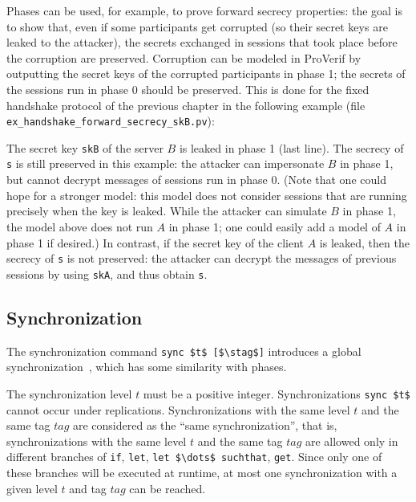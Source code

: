 \documentclass{book}
\begin{document}
Phases can be used, for example, to prove forward secrecy properties: the goal is to show that, even if some participants get corrupted (so their secret keys are leaked to the attacker), the secrets exchanged in sessions that took place before the corruption are preserved. Corruption can be modeled in ProVerif by outputting the secret keys of the corrupted participants in phase 1; the secrets of the sessions run in phase 0 should be preserved. This is done for the fixed handshake protocol of the previous chapter in the following example (file {\tt {\docexdir}ex\_handshake\_forward\_secrecy\_skB.pv}):
%

%
The secret key \lstinline!skB! of the server $B$ is leaked in phase 1 (last line).
The secrecy of \lstinline!s! is still preserved in this example: the attacker
can impersonate $B$ in phase 1, but cannot decrypt messages of sessions run in phase 0. (Note that one could hope for a stronger model: this model does not consider sessions that are running precisely when the key is leaked. While the attacker can simulate $B$ in phase 1, the model above does not run $A$ in phase 1; one could easily add a model of $A$ in phase 1 if desired.)
In contrast, if the secret key of the client $A$ is leaked, then the secrecy of \lstinline!s! is not preserved: the attacker can decrypt the messages of previous sessions by using \lstinline!skA!, and thus obtain \lstinline!s!.

\subsection{Synchronization}\label{sec:sync}

\newcommand{\stag}{\mathit{tag}}

The synchronization command \lstinline!sync $t$ [$\stag$]!
introduces a global synchronization~\cite{BlanchetSmythCSF16},
which has some similarity with phases.

The synchronization level $t$ must be a positive integer.
Synchronizations \lstinline!sync $t$! cannot occur under replications.
Synchronizations with the same level $t$ and the same tag $\stag$
are considered as the ``same synchronization'', that is,
synchronizations with the same level $t$ and the same tag $\stag$
are allowed only in different branches of \lstinline!if!,
\lstinline!let!, \lstinline!let $\dots$ suchthat!, \lstinline!get!.
Since only one of these branches will be executed at runtime,
at most one synchronization with a given level $t$ and tag $\stag$ can
be reached.
\end{document}
